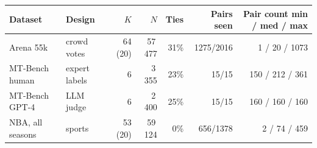 \begin{tabular}{llrrrrr}
\toprule
Dataset & Design & $K$ & $N$ & Ties & Pairs seen & Pair count min / med / max \\
\midrule
Arena 55k & crowd votes & 64 (20) & 57\,477 & 31\% & 1275/2016 & 1 / 20 / 1073 \\
MT-Bench human & expert labels & 6 & 3\,355 & 23\% & 15/15 & 150 / 212 / 361 \\
MT-Bench GPT-4 & LLM judge & 6 & 2\,400 & 25\% & 15/15 & 160 / 160 / 160 \\
NBA, all seasons & sports & 53 (20) & 59\,124 & 0\% & 656/1378 & 2 / 74 / 459 \\
\bottomrule
\end{tabular}
